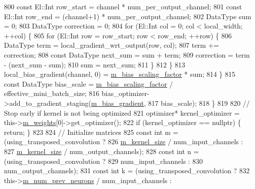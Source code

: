\begin{DoxyCode}
800         \textcolor{keyword}{const} El::Int row\_start = channel * num\_per\_output\_channel;
801         \textcolor{keyword}{const} El::Int row\_end = (channel+1) * num\_per\_output\_channel;
802         DataType sum = 0;
803         DataType correction = 0;
804         \textcolor{keywordflow}{for} (El::Int col = 0; col < local\_width; ++col) \{
805           \textcolor{keywordflow}{for} (El::Int row = row\_start; row < row\_end; ++row) \{
806             DataType term = local\_gradient\_wrt\_output(row, col);
807             term += correction;
808             \textcolor{keyword}{const} DataType next\_sum = sum + term;
809             correction = term - (next\_sum - sum);
810             sum = next\_sum;
811           \}
812         \}
813         local\_bias\_gradient(channel, 0) = \hyperlink{classlbann_1_1base__convolution__layer_a5abe0bcd128b66a41fa481b28a9c2104}{m\_bias\_scaling\_factor} * sum;
814       \}
815       \textcolor{keyword}{const} DataType bias\_scale = \hyperlink{classlbann_1_1base__convolution__layer_a5abe0bcd128b66a41fa481b28a9c2104}{m\_bias\_scaling\_factor} / effective\_mini\_batch\_size;
816       bias\_optimizer->add\_to\_gradient\_staging(\hyperlink{classlbann_1_1base__convolution__layer_a2ee1db4a1a74f167e3472d5ed7075179}{m\_bias\_gradient},
817                                               bias\_scale);
818     \}
819 
820     \textcolor{comment}{// Stop early if kernel is not being optimized}
821     optimizer* kernel\_optimizer = this->\hyperlink{classlbann_1_1Layer_a7954e30fbf9100a6ba4b56d02767a469}{m\_weights}[0]->get\_optimizer();
822     \textcolor{keywordflow}{if} (kernel\_optimizer == \textcolor{keyword}{nullptr}) \{ \textcolor{keywordflow}{return}; \}
823 
824     \textcolor{comment}{// Initialize matrices}
825     \textcolor{keyword}{const} \textcolor{keywordtype}{int} m = (using\_transposed\_convolution ?
826                    \hyperlink{classlbann_1_1base__convolution__layer_aa9da3e44499643a86bd611b5eb500dd4}{m\_kernel\_size} / num\_input\_channels :
827                    \hyperlink{classlbann_1_1base__convolution__layer_aa9da3e44499643a86bd611b5eb500dd4}{m\_kernel\_size} / num\_output\_channels);
828     \textcolor{keyword}{const} \textcolor{keywordtype}{int} n = (using\_transposed\_convolution ?
829                    num\_input\_channels :
830                    num\_output\_channels);
831     \textcolor{keyword}{const} \textcolor{keywordtype}{int} k = (using\_transposed\_convolution ?
832                    this->\hyperlink{classlbann_1_1Layer_ac7b30f4e28d58204bfcbb76886f9136d}{m\_num\_prev\_neurons} / num\_input\_channels :

\end{DoxyCode}
